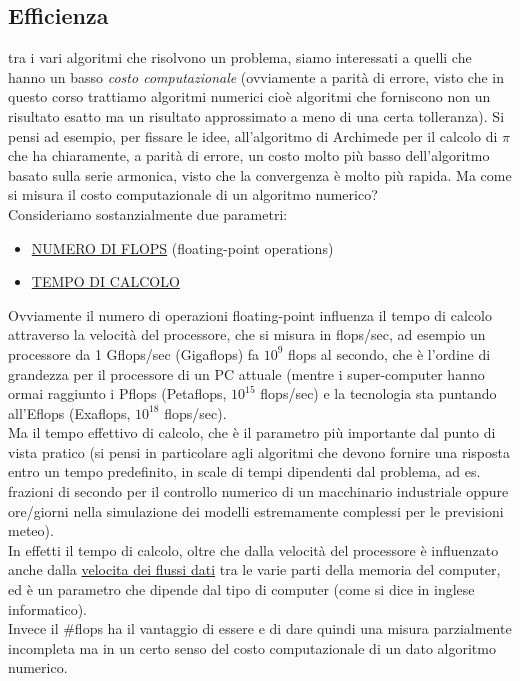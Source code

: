 \subsection{Efficienza}
tra i vari algoritmi che risolvono un problema, siamo interessati a quelli che hanno un basso \textit{costo computazionale} (ovviamente a parità di errore, visto che in questo corso trattiamo algoritmi numerici cioè algoritmi che forniscono non un risultato esatto ma un risultato approssimato a meno di una certa tolleranza). Si pensi ad esempio, per fissare le idee, all'algoritmo di Archimede per il calcolo di $\pi$ che ha chiaramente, a parità di errore, un costo molto più basso dell'algoritmo basato sulla serie armonica, visto che la convergenza è molto più rapida.
\newline \newline
Ma come si misura il costo computazionale di un algoritmo numerico?\\ 
Consideriamo sostanzialmente due parametri:
\begin{itemize}
    \item \uline{NUMERO DI FLOPS} (floating-point operations)
    \item \uline{TEMPO DI CALCOLO} 
\end{itemize}
Ovviamente il numero di operazioni floating-point influenza il tempo di calcolo attraverso la velocità del processore, che si misura in flops/sec, ad esempio un processore da 1 Gflops/sec (Gigaflops) fa $10^9$ flops al secondo, che è l'ordine di grandezza per il processore di un PC attuale (mentre i super-computer hanno ormai raggiunto i Pflops (Petaflops, $10^{15}$ flops/sec) e la tecnologia sta puntando all'Eflops (Exaflops, $10^{18}$ flops/sec).\\ 
Ma il tempo effettivo di calcolo, che è il parametro più importante dal punto di vista pratico (si pensi in particolare agli algoritmi  che devono fornire una risposta entro un tempo predefinito, in scale di tempi dipendenti dal problema, ad es. frazioni di secondo per il controllo numerico di un macchinario industriale oppure ore/giorni nella simulazione dei modelli estremamente complessi per le previsioni meteo).\\ 
In effetti il tempo di calcolo, oltre che dalla velocità del processore è influenzato anche dalla \uline{velocita dei flussi dati} tra le varie parti della memoria del computer, ed è un parametro che dipende dal tipo di computer (come si dice in inglese informatico).\\
Invece il \#flops ha il vantaggio di essere  e di dare quindi una misura parzialmente incompleta ma in un certo senso  del costo computazionale di un dato algoritmo numerico. \\
